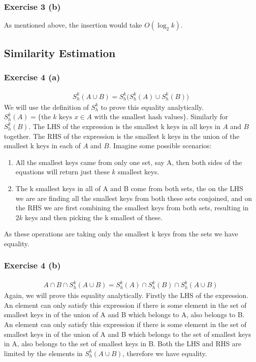 \subsubsection{Exercise 3 (b)}
As mentioned above, the insertion would take \(O(\log_2 k)\).
\subsection{Similarity Estimation}

\subsubsection{Exercise 4 (a)}
\begin{align*}
&S_h^k(A \cup B) = S_h^k\big(S_h^k(A) \cup S_h^k(B)\big)
\end{align*}
We will use the definition of \(S_h^k \) to prove this equality analytically. \(S_h^k(A) = \{\text{the } k \text{ keys } x \in A \text{ with the smallest hash values}\} \). Similarly for \(S_h^k(B)\). The LHS of the expression is the smallest k keys in all keys in \(A\) and \(B\) together. The RHS of the expression is the smallest k keys in the union of the smallest k keys in each of \(A\) and \(B\).  Imagine some possible scenarios:
\begin{enumerate}
\item All the smallest keys came from only one set, say A, then both sides of the equations will return just these \(k\) smallest keys.  
\item The k smallest keys in all of A and B come from both sets, the on the LHS we are are finding all the smallest keys from both these sets conjoined, and on the RHS we are first combining the smallest keys from both sets, resulting in \(2k\) keys and then picking the k smallest of these.
\end{enumerate}
As these operations are taking only the smallest k keys from the sets we have equality.
\subsubsection{Exercise 4 (b)}
\begin{align*}
&A \cap B \cap S_h^k(A \cup B) = S_h^k(A) \cap S_h^k(B) \cap S_h^k(A \cup B)
\end{align*}
Again, we will prove this equality analytically. Firstly the LHS of the expression. An element can only satisfy this expression if there is some element in the set of smallest keys in of the union of A and B which belongs to A, also belongs to B. An element can only satisfy this expression if there is some element in the set of smallest keys in of the union of A and B which belongs to the set of smallest keys in A, also belongs to the set of smallest keys in B. Both the LHS and RHS are limited by the elements in \( S_h^k(A \cup B)\), therefore we have equality.

